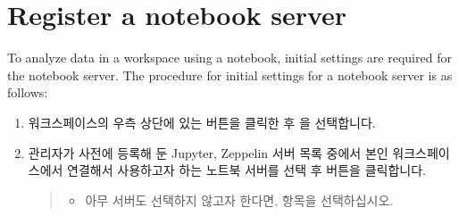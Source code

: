 \documentclass[letterpaper,10pt,english]{sphinxmanual}
\begin{document}
\section{Register a notebook server}
\label{\detokenize{discovery/part05/register_a_notebook_server:id1}}\label{\detokenize{discovery/part05/register_a_notebook_server::doc}}
To analyze data in a workspace using a notebook, initial settings are required for the notebook server. The procedure for initial settings for a notebook server is as follows:
\begin{enumerate}
\def\theenumi{\arabic{enumi}}
\def\labelenumi{\theenumi .}
\makeatletter\def\p@enumii{\p@enumi \theenumi .}\makeatother
\item {} 
워크스페이스의 우측 상단에 있는  버튼을 클릭한 후 을 선택합니다.
\begin{quote}

\begin{figure}[H]
\centering

\noindent{}
\end{figure}
\end{quote}

\item {} 
관리자가 사전에 등록해 둔 Jupyter, Zeppelin 서버 목록 중에서 본인 워크스페이스에서 연결해서 사용하고자 하는 노트북 서버를 선택 후 버튼을 클릭합니다.
\begin{quote}
\begin{itemize}
\item {} 
아무 서버도 선택하지 않고자 한다면,  항목을 선택하십시오.

\end{itemize}

\begin{figure}[H]
\centering

\noindent{}
\end{figure}
\end{quote}

\end{enumerate}
\end{document}
